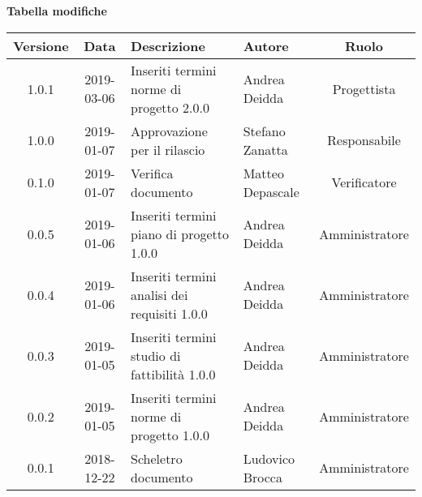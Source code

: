 \begin{center}
	\textbf{Tabella modifiche}
	\end{center}
	\begin{center}
		\begin{tabularx}{\textwidth}{|c|c|X|X|c|}
			\hline
			\textbf{Versione} & \textbf{Data} & \textbf{Descrizione} & \textbf{Autore} & \textbf{Ruolo} \\
			\hline
			1.0.1 & 2019-03-06 & Inseriti termini norme di progetto 2.0.0 & Andrea Deidda & Progettista \\
			\hline
			1.0.0 & 2019-01-07 & Approvazione per il rilascio & Stefano Zanatta & Responsabile \\
			\hline
			0.1.0 & 2019-01-07 & Verifica documento & Matteo Depascale & Verificatore \\
			\hline
			0.0.5 & 2019-01-06 & Inseriti termini piano di progetto 1.0.0 & Andrea Deidda & Amministratore\\
			\hline
			0.0.4 & 2019-01-06 & Inseriti termini analisi dei requisiti 1.0.0 & Andrea Deidda & Amministratore\\
			\hline
			0.0.3 & 2019-01-05 & Inseriti termini studio di fattibilità 1.0.0 & Andrea Deidda & Amministratore\\
			\hline
			0.0.2 & 2019-01-05 & Inseriti termini norme di progetto 1.0.0 & Andrea Deidda & Amministratore\\
			\hline
			0.0.1 & 2018-12-22 & Scheletro documento & Ludovico Brocca & Amministratore\\
			\hline
		\end{tabularx}
	\end{center}
\newpage